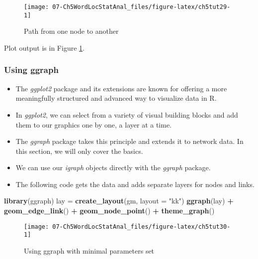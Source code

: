 \documentclass[
]{article}
\newenvironment{Shaded}{\begin{snugshade}}{\end{snugshade}}
\newcommand{\AttributeTok}[1]{\textcolor[rgb]{0.13,0.29,0.53}{#1}}
\newcommand{\FunctionTok}[1]{\textcolor[rgb]{0.13,0.29,0.53}{\textbf{#1}}}
\newcommand{\NormalTok}[1]{#1}
\newcommand{\OtherTok}[1]{\textcolor[rgb]{0.56,0.35,0.01}{#1}}
\newcommand{\SpecialCharTok}[1]{\textcolor[rgb]{0.81,0.36,0.00}{\textbf{#1}}}
\newcommand{\StringTok}[1]{\textcolor[rgb]{0.31,0.60,0.02}{#1}}
\providecommand{\tightlist}{%
  \setlength{\itemsep}{0pt}\setlength{\parskip}{0pt}}
\begin{document}
\begin{figure}

{\centering \texttt{[image: 07-Ch5WordLocStatAnal\_files/figure-latex/ch5tut29-1]} 

}

\caption{Path from one node to another}\label{fig:ch5tut29}
\end{figure}

Plot output is in Figure \ref{fig:ch5tut29}.

\hypertarget{using-ggraph}{%
\subsubsection{Using ggraph}\label{using-ggraph}}

\begin{itemize}
\tightlist
\item
  The \emph{ggplot2} package and its extensions are known for offering a more meaningfully structured and advanced way to visualize data in R.
\item
  In \emph{ggplot2}, we can select from a variety of visual building blocks and add them to our graphics one by one, a layer at a time.
\item
  The \emph{ggraph} package takes this principle and extends it to network data. In this section, we will only cover the basics.
\item
  We can use our \emph{igraph} objects directly with the \emph{ggraph} package.
\item
  The following code gets the data and adds separate layers for nodes and links.
\end{itemize}

\begin{Shaded}
\begin{Highlighting}[]
\FunctionTok{library}\NormalTok{(ggraph)}
\NormalTok{lay }\OtherTok{=} \FunctionTok{create\_layout}\NormalTok{(gm, }\AttributeTok{layout =} \StringTok{"kk"}\NormalTok{)}
\FunctionTok{ggraph}\NormalTok{(lay) }\SpecialCharTok{+} 
  \FunctionTok{geom\_edge\_link}\NormalTok{() }\SpecialCharTok{+} 
  \FunctionTok{geom\_node\_point}\NormalTok{() }\SpecialCharTok{+}
  \FunctionTok{theme\_graph}\NormalTok{()}
\end{Highlighting}
\end{Shaded}

\begin{figure}

{\centering \texttt{[image: 07-Ch5WordLocStatAnal\_files/figure-latex/ch5tut30-1]} 

}

\caption{Using ggraph with minimal parameters set}\label{fig:ch5tut30}
\end{figure}
\end{document}
